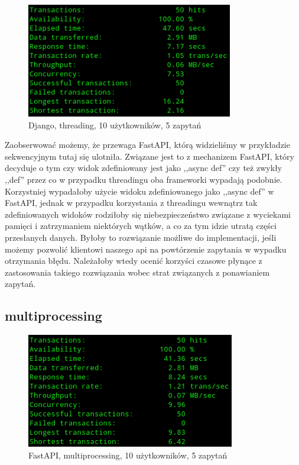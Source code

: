 \begin{figure}[H]
    \includegraphics[height=50mm]{zdjecia/10_req_thread_django}
    \centering
    \caption{Django, threading, 10 użytkowników, 5 zapytań}
\end{figure}
Zaobserwować możemy, że przewaga FastAPI, którą widzieliśmy w przykładzie sekwencyjnym tutaj się ulotniła. Związane jest to z mechanizem FastAPI, który decyduje o tym czy widok zdefiniowany jest jako ,,async def'' czy też zwykły ,,def'' przez co w przypadku threadingu oba frameworki wypadają podobnie. Korzystniej wypadałoby użycie widoku zdefiniowanego jako ,,async def'' w FastAPI, jednak w przypadku korzystania z threadingu wewnątrz tak zdefiniowanych widoków rodziłoby się niebezpieczeństwo związane z wyciekami pamięci i zatrzymaniem niektórych wątków, a co za tym idzie utratą części przesłanych danych. Byłoby to rozwiązanie możliwe do implementacji, jeśli możemy pozwolić klientowi naszego api na powtórzenie zapytania w wypadku otrzymania błędu. Należałoby wtedy ocenić korzyści czasowe płynące z zastosowania takiego rozwiązania wobec strat związanych z ponawianiem zapytań.

\subsection{multiprocessing}
\begin{figure}[H]
    \includegraphics[height=50mm]{zdjecia/10_req_process_fast}
    \centering
    \caption{FastAPI, multiprocessing, 10 użytkowników, 5 zapytań}
\end{figure}

